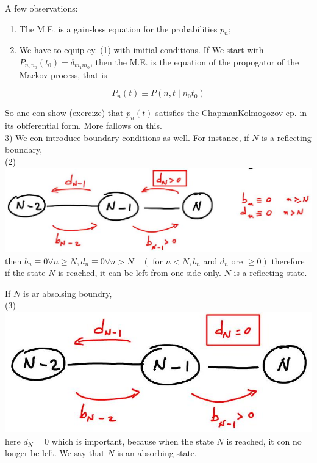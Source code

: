 \documentclass[10pt]{article}
\begin{document}
A few observations:

\begin{enumerate}
  \item The M.E. is a gain-loss equation for the probabilities $p_{n}$;
  \item We have to equip ey. (1) with imitial conditions. If We start with $P_{n, n_{0}}\left(t_{0}\right)=\delta_{m_{1} m_{0}}$, then the M.E. is the equation of the propogator of the Mackov process, that is
\end{enumerate}

$$
P_{n}(t) \equiv P\left(n, t \mid n_{0} t_{0}\right)
$$

So ane con show (exercize) that $p_{n}(t)$ satisfies the ChapmanKolmogozov ep. in its obfferential form. More fallows on this.\\
3) We con introduce boundary conditions as well. For instance, if $N$ is a reflecting boundary,\\
(2)\\
\includegraphics[max width=\textwidth, center]{2025_10_17_b1062645fdca57c84af1g-02}\\
then $b_{n} \equiv 0 \forall n \geqslant N, d_{n} \equiv 0 \forall n>N \quad\left(\right.$ for $n<N, b_{n}$ and $d_{n}$ ore $\left.\geqslant 0\right)$ therefore if the state $N$ is reached, it can be left from one side only. $N$ is a reflecting state.

If $N$ is ar absolsing boundry,\\
(3)\\
\includegraphics[max width=\textwidth, center]{2025_10_17_b1062645fdca57c84af1g-03}\\
here $d_{N}=0$ which is important, because when the state $N$ is reached, it con no longer be left. We say that $N$ is an absorbing state.
\end{document}
